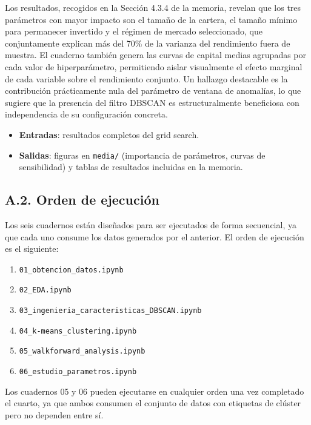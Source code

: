 Los resultados, recogidos en la Sección 4.3.4 de la memoria, revelan que los tres parámetros con mayor impacto son el tamaño de la cartera, el tamaño mínimo para permanecer invertido y el régimen de mercado seleccionado, que conjuntamente explican más del 70\% de la varianza del rendimiento fuera de muestra. El cuaderno también genera las curvas de capital medias agrupadas por cada valor de hiperparámetro, permitiendo aislar visualmente el efecto marginal de cada variable sobre el rendimiento conjunto. Un hallazgo destacable es la contribución prácticamente nula del parámetro de ventana de anomalías, lo que sugiere que la presencia del filtro DBSCAN es estructuralmente beneficiosa con independencia de su configuración concreta.

\begin{itemize}
    \item \textbf{Entradas}: resultados completos del grid search.
    \item \textbf{Salidas}: figuras en \texttt{media/} (importancia de parámetros, curvas de sensibilidad) y tablas de resultados incluidas en la memoria.
\end{itemize}

\subsection*{A.2. Orden de ejecución}

Los seis cuadernos están diseñados para ser ejecutados de forma secuencial, ya que cada uno consume los datos generados por el anterior. El orden de ejecución es el siguiente:

\begin{enumerate}
    \item \texttt{01\_obtencion\_datos.ipynb}
    \item \texttt{02\_EDA.ipynb}
    \item \texttt{03\_ingenieria\_caracteristicas\_DBSCAN.ipynb}
    \item \texttt{04\_k-means\_clustering.ipynb}
    \item \texttt{05\_walkforward\_analysis.ipynb}
    \item \texttt{06\_estudio\_parametros.ipynb}
\end{enumerate}

Los cuadernos 05 y 06 pueden ejecutarse en cualquier orden una vez completado el cuarto, ya que ambos consumen el conjunto de datos con etiquetas de clúster pero no dependen entre sí.

